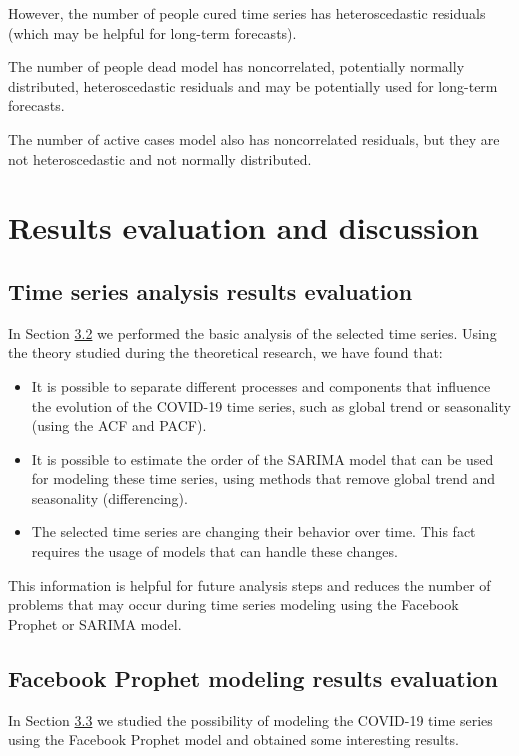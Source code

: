 However, the number of people cured time series has heteroscedastic residuals (which may be helpful for long-term forecasts). 

The number of people dead model has noncorrelated, potentially normally distributed, heteroscedastic residuals and may be potentially used for long-term forecasts.

The number of active cases model also has noncorrelated residuals, but they are not heteroscedastic and not normally distributed.

\section{Results evaluation and discussion}

\subsection{Time series analysis results evaluation}

In Section \hyperlink{s3.2}{3.2} we performed the basic analysis of the selected time series. Using the theory studied during the theoretical research, we have found that:
\begin{itemize}
    \item It is possible to separate different processes and components that influence the evolution of the COVID-19 time series, such as global trend or seasonality (using the ACF and PACF).
    \item It is possible to estimate the order of the SARIMA model that can be used for modeling these time series, using methods that remove global trend and seasonality (differencing).
    \item The selected time series are changing their behavior over time. This fact requires the usage of models that can handle these changes.
\end{itemize}

This information is helpful for future analysis steps and reduces the number of problems that may occur during time series modeling using the Facebook Prophet or SARIMA model.

\subsection{Facebook Prophet modeling results evaluation}

In Section \hyperlink{s3.3}{3.3} we studied the possibility of modeling the COVID-19 time series using the Facebook Prophet model and obtained some interesting results. 

